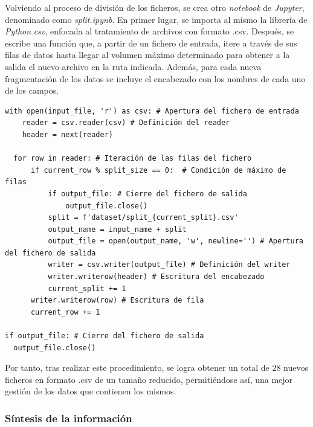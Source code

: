\vspace{3mm}

Volviendo al proceso de división de los ficheros, se crea otro \textit{notebook} de \textit{Jupyter}, denominado como \textit{split.ipynb}. En primer lugar, se importa al mismo la librería de \textit{Python} \textit{csv}, enfocada al tratamiento de archivos con formato .csv. Después, se escribe una función que, a partir de un fichero de entrada, itere a través de sus filas de datos hasta llegar al volumen máximo determinado para obtener a la salida el nuevo archivo en la ruta indicada. Además, para cada nueva fragmentación de los datos se incluye el encabezado con los nombres de cada uno de los campos.

\vspace{3mm}

\begin{lstlisting}[style=Python, caption={Fragmentación de ficheros iniciales}]
  with open(input_file, 'r') as csv: # Apertura del fichero de entrada
    reader = csv.reader(csv) # Definición del reader
    header = next(reader)  

  for row in reader: # Iteración de las filas del fichero
      if current_row % split_size == 0:  # Condición de máximo de filas
          if output_file: # Cierre del fichero de salida 
              output_file.close()
          split = f'dataset/split_{current_split}.csv'
          output_name = input_name + split
          output_file = open(output_name, 'w', newline='') # Apertura del fichero de salida
          writer = csv.writer(output_file) # Definición del writer
          writer.writerow(header) # Escritura del encabezado
          current_split += 1
      writer.writerow(row) # Escritura de fila
      current_row += 1

if output_file: # Cierre del fichero de salida
  output_file.close()
\end{lstlisting}

\vspace{3mm}

Por tanto, tras realizar este procedimiento, se logra obtener un total de 28 nuevos ficheros en formato .csv de un tamaño reducido, permitiéndose así, una mejor gestión de los datos que contienen los mismos.

\subsubsection{Síntesis de la información}
\label{sec:datasamples}

